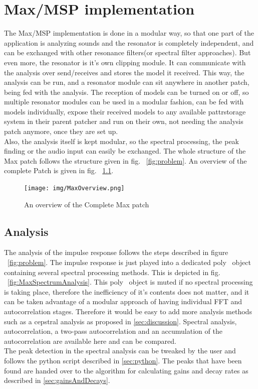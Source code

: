 \chapter{Max/MSP implementation}
\label{max}
The Max/MSP implementation is done in a modular way, so that one part of the application is analyzing sounds and the resonator is completely independent, and can be exchanged with other resonance filters(or spectral filter approaches). But even more, the resonator is it's own clipping module. It can communicate with the analysis over send/receives and stores the model it received. This way, the analysis can be run, and a resonator module can sit anywhere in another patch, being fed with the analysis. The reception of models can be turned on or off, so multiple resonator modules can be used in a modular fashion, can be fed with models individually, expose  their received models to any available pattrstorage system in their parent patcher and run on their own, not needing the analysis patch anymore, once they are set up.\\
Also, the analysis itself is kept modular, so the spectral processing, the peak finding or the audio input can easily be exchanged.
The whole structure of the Max patch follows the structure given in fig. ~\ref{fig:problem}. An overview of the complete Patch is given in fig. ~\ref{fig:maxOverview}.

\begin{figure}[H]
	\begin{center}
		\texttt{[image: img/MaxOverview.png]}
		\caption{An overview of the Complete Max patch}
		\label{fig:maxOverview}
	\end{center}
\end{figure}

\section{Analysis} %
    \label{sec:analysis}
 
 The analysis of the impulse response follows the steps described in figure ~\ref{fig:problem}. The impulse response is just played into a dedicated poly~ object containing several spectral processing methods. This is depicted in fig. ~\ref{fig:MaxSpectrumAnalysis}. This poly~ object is muted if no spectral processing is taking place, therefore the inefficiency of it's contents does not matter, and it can be taken advantage of a modular approach of having individual FFT and autocorrelation stages. Therefore it would be easy to add more analysis methods such as a cepstral analysis as proposed in \ref{sec:discussion}. Spectral analysis, autocorrelation, a two-pass autocorrelation and an accumulation of the autocorrelation are available here and can be compared. \\
 The peak detection in the spectral analysis can be tweaked by the user and follows the python script described in \ref{sec:python}.
The peaks that have been found are handed over to the algorithm for calculating gains and decay rates as described in \ref{sec:gainsAndDecays}.


